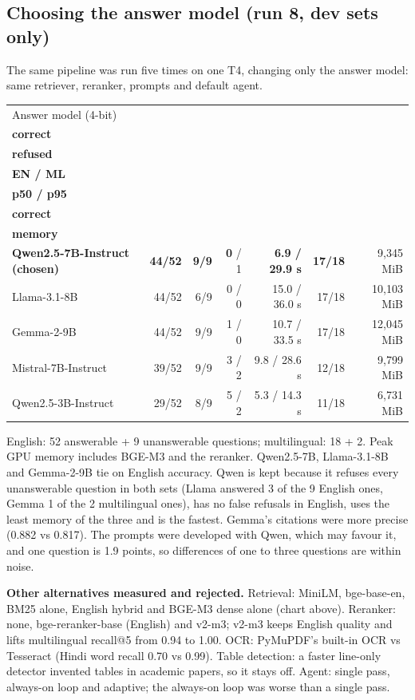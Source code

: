 \documentclass[10pt,a4paper]{article}
\newcommand{\note}[1]{{\raggedright\color{muted}\fontsize{8.3}{10}\selectfont #1\par}}
\begin{document}
\subsection{Choosing the answer model (run 8, dev sets only)}
The same pipeline was run five times on one T4, changing only the answer model: same retriever, reranker, prompts and default agent.
\renewcommand{\arraystretch}{1.2}
{\fontsize{8.3}{10}\selectfont
\begin{tabularx}{\textwidth}{@{}>{\raggedright\arraybackslash}X r r r r r r@{}}
\toprule
Answer model (4-bit) & \shortstack[r]{\textbf{English}\\\textbf{correct}} & \shortstack[r]{\textbf{Unanswerable}\\\textbf{refused}} & \shortstack[r]{\textbf{False refusals}\\\textbf{EN / ML}} & \shortstack[r]{\textbf{Latency}\\\textbf{p50 / p95}} & \shortstack[r]{\textbf{Multilingual}\\\textbf{correct}} & \shortstack[r]{\textbf{Peak GPU}\\\textbf{memory}} \\ \midrule
\textbf{Qwen2.5-7B-Instruct (chosen)} & \textbf{44/52} & \textbf{9/9} & \textbf{0} / 1 & \textbf{6.9 / 29.9 s} & \textbf{17/18} & 9,345 MiB \\
Llama-3.1-8B & 44/52 & 6/9 & 0 / 0 & 15.0 / 36.0 s & 17/18 & 10,103 MiB \\
Gemma-2-9B & 44/52 & 9/9 & 1 / 0 & 10.7 / 33.5 s & 17/18 & 12,045 MiB \\
Mistral-7B-Instruct & 39/52 & 9/9 & 3 / 2 & 9.8 / 28.6 s & 12/18 & 9,799 MiB \\
Qwen2.5-3B-Instruct & 29/52 & 8/9 & 5 / 2 & 5.3 / 14.3 s & 11/18 & 6,731 MiB \\
\bottomrule
\end{tabularx}}
\note{English: 52 answerable + 9 unanswerable questions; multilingual: 18 + 2. Peak GPU memory includes BGE-M3 and the reranker.
Qwen2.5-7B, Llama-3.1-8B and Gemma-2-9B tie on English accuracy. Qwen is kept because it refuses every unanswerable question in both sets (Llama answered 3 of the 9 English ones,
Gemma 1 of the 2 multilingual ones), has no false refusals in English, uses the least memory of the three and is the fastest. Gemma's citations were more precise (0.882 vs 0.817).
The prompts were developed with Qwen, which may favour it, and one question is 1.9 points, so differences of one to three questions are within noise.}

\textbf{Other alternatives measured and rejected.} Retrieval: MiniLM, bge-base-en, BM25 alone, English hybrid and BGE-M3 dense alone (chart above).
Reranker: none, bge-reranker-base (English) and v2-m3; v2-m3 keeps English quality and lifts multilingual recall@5 from 0.94 to 1.00. OCR: PyMuPDF's built-in OCR vs Tesseract (Hindi word recall 0.70 vs 0.99).
Table detection: a faster line-only detector invented tables in academic papers, so it stays off. Agent: single pass, always-on loop and adaptive; the always-on loop was worse than a single pass.
\end{document}
